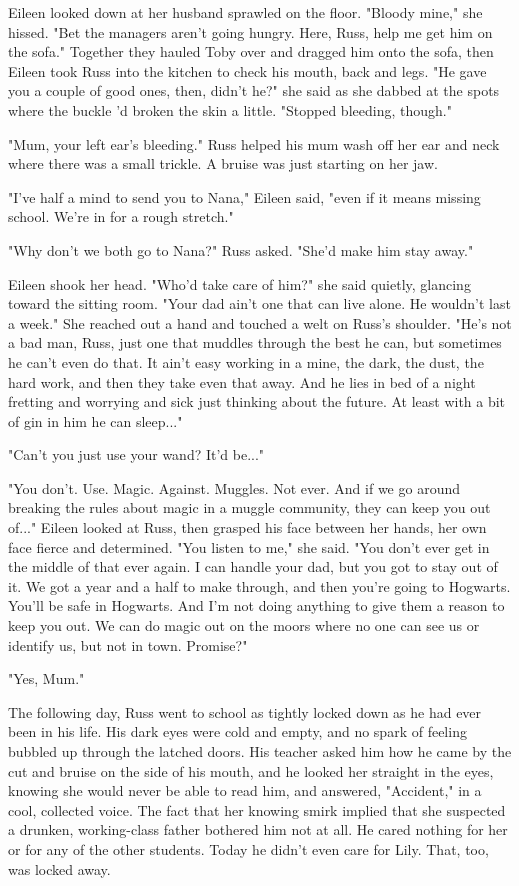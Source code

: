 \documentclass[a4paper,11pt]{article}
\begin{document}
Eileen looked down at her husband sprawled on the floor. "Bloody mine," she hissed. "Bet the managers aren't going hungry. Here, Russ, help me get him on the sofa." Together they hauled Toby over and dragged him onto the sofa, then Eileen took Russ into the kitchen to check his mouth, back and legs. "He gave you a couple of good ones, then, didn't he?" she said as she dabbed at the spots where the buckle 'd broken the skin a little. "Stopped bleeding, though."

"Mum, your left ear's bleeding." Russ helped his mum wash off her ear and neck where there was a small trickle. A bruise was just starting on her jaw.

"I've half a mind to send you to Nana," Eileen said, "even if it means missing school. We're in for a rough stretch."

"Why don't we both go to Nana?" Russ asked. "She'd make him stay away."

Eileen shook her head. "Who'd take care of him?" she said quietly, glancing toward the sitting room. "Your dad ain't one that can live alone. He wouldn't last a week." She reached out a hand and touched a welt on Russ's shoulder. "He's not a bad man, Russ, just one that muddles through the best he can, but sometimes he can't even do that. It ain't easy working in a mine, the dark, the dust, the hard work, and then they take even that away. And he lies in bed of a night fretting and worrying and sick just thinking about the future. At least with a bit of gin in him he can sleep..."

"Can't you just use your wand? It'd be..."

"You don't. Use. Magic. Against. Muggles. Not ever. And if we go around breaking the rules about magic in a muggle community, they can keep you out of..." Eileen looked at Russ, then grasped his face between her hands, her own face fierce and determined. "You listen to me," she said. "You don't ever get in the middle of that ever again. I can handle your dad, but you got to stay out of it. We got a year and a half to make through, and then you're going to Hogwarts. You'll be safe in Hogwarts. And I'm not doing anything to give them a reason to keep you out. We can do magic out on the moors where no one can see us or identify us, but not in town. Promise?"

"Yes, Mum."

The following day, Russ went to school as tightly locked down as he had ever been in his life. His dark eyes were cold and empty, and no spark of feeling bubbled up through the latched doors. His teacher asked him how he came by the cut and bruise on the side of his mouth, and he looked her straight in the eyes, knowing she would never be able to read him, and answered, "Accident," in a cool, collected voice. The fact that her knowing smirk implied that she suspected a drunken, working-class father bothered him not at all. He cared nothing for her or for any of the other students. Today he didn't even care for Lily. That, too, was locked away.
\end{document}
